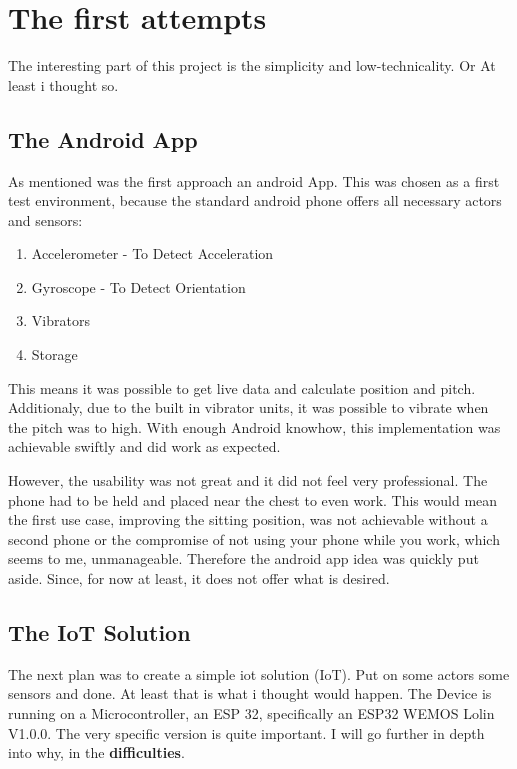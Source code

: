 \chapter*{The first attempts}
\label{chap:The first attempts}
\renewcommand{\thesection}{\arabic{section}}
\setcounter{section}{0}

The interesting part of this project is the simplicity and low-technicality. Or At least i thought so.

\section{The Android App}

As mentioned was the first approach an android App. This was chosen as a first test environment, because the standard android phone offers all necessary actors and sensors: 
\begin{enumerate}
    \item \gls{Accelerometer} - To Detect Acceleration
    \item \gls{Gyroscope} - To Detect Orientation
    \item Vibrators
    \item Storage
\end{enumerate}

This means it was possible to get live data and calculate position and pitch. Additionaly, due to the built in vibrator units, it was possible to vibrate when the pitch was to high. With enough Android knowhow, this implementation was achievable swiftly and did work as expected.

However, the usability was not great and it did not feel very professional. The phone had to be held and placed near the chest to even work. This would mean the first use case, improving the sitting position, was not achievable without a second phone or the compromise of not using your phone while you work, which seems to me, unmanageable. Therefore the android app idea was quickly put aside. Since, for now at least, it does not offer what is desired.

\newpage
\section{The IoT Solution}

The next plan was to create a simple \acrshort{iot} solution (\gls{IoT}). Put on some actors some sensors and done. At least that is what i thought would happen. The Device is running on a \gls{Microcontroller}, an ESP 32, specifically an ESP32 WEMOS Lolin V1.0.0. The very specific version is quite important. I will go further in depth into why, in the \textbf{difficulties}.

